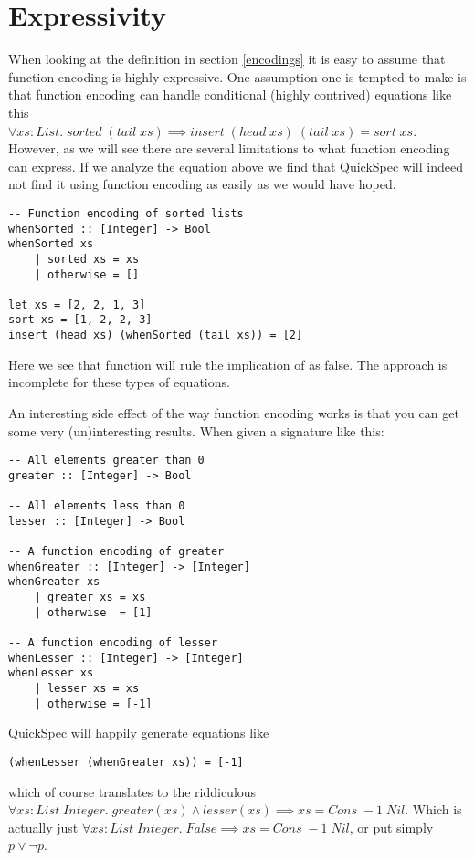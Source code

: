 \section{Expressivity}

When looking at the definition in 
section \ref{encodings} it is easy to assume
that function encoding is highly expressive.
One assumption one is tempted to make is that
function encoding can handle conditional (highly contrived)
equations like this\\
$\forall xs : List.\;sorted\;(tail\; xs) \implies insert\;(head\;xs)\;(tail\;xs)=sort\;xs$.
However, as we will see there are several limitations to what function encoding can express.
If we analyze the equation above we find that QuickSpec will indeed not find it
using function encoding as easily as we would have hoped.
\begin{verbatim}
-- Function encoding of sorted lists
whenSorted :: [Integer] -> Bool
whenSorted xs
    | sorted xs = xs
    | otherwise = []

let xs = [2, 2, 1, 3]
sort xs = [1, 2, 2, 3]
insert (head xs) (whenSorted (tail xs)) = [2]
\end{verbatim}
Here we see that function will rule the implication of as false. The approach is
incomplete for these types of equations.

An interesting side effect of the way function encoding
works is that you can get some very (un)interesting results. 
When given a signature like this:
\begin{verbatim}
-- All elements greater than 0
greater :: [Integer] -> Bool

-- All elements less than 0 
lesser :: [Integer] -> Bool

-- A function encoding of greater
whenGreater :: [Integer] -> [Integer]
whenGreater xs
    | greater xs = xs
    | otherwise  = [1]

-- A function encoding of lesser 
whenLesser :: [Integer] -> [Integer]
whenLesser xs
    | lesser xs = xs
    | otherwise = [-1]
\end{verbatim}
QuickSpec will happily generate equations like
\begin{verbatim}(whenLesser (whenGreater xs)) = [-1]\end{verbatim}
which of course translates to the riddiculous\\
$\forall xs : List\; Integer.\; greater(xs)\wedge lesser(xs)\implies xs = Cons\; -1\; Nil$.
Which is actually just $\forall xs : List\; Integer.\; False\implies xs = Cons\; -1\; Nil$,
or put simply $p\vee \neg p$.

